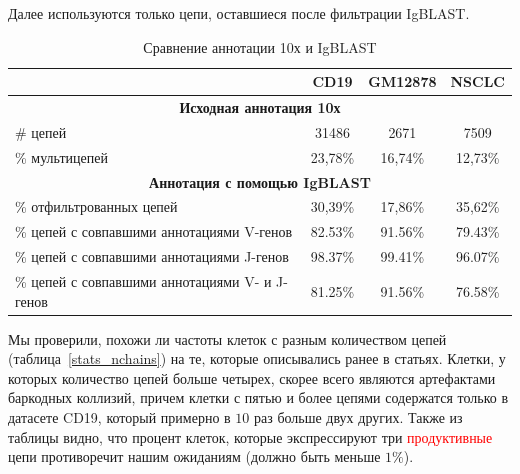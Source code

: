 \documentclass{spbau-diploma}
\newcommand{\todo}{\textcolor{red}}
\begin{document}
Далее используются только цепи, оставшиеся после фильтрации IgBLAST.  

\begin{table}[h]
\centering
\begin{tabular}{|l|c|c|c|}
\hline
                                               & \multicolumn{1}{c|}{\textbf{CD19}} & \multicolumn{1}{c|}{\textbf{GM12878}} & \multicolumn{1}{c|}{\textbf{NSCLC}} \\ \hline
\multicolumn{4}{|c|}{\textbf{Исходная аннотация 10х}}                                                                                                             \\ \hline
\# цепей                                       & 31486                              & 2671                                  & 7509                                \\ \hline
\% мультицепей                                 & 23,78\%                            & 16,74\%                               & 12,73\%                             \\ \hline
\multicolumn{4}{|c|}{\textbf{Аннотация с помощью IgBLAST}}                                                                                                       \\ \hline
\% отфильтрованных цепей                       & 30,39\%                            & 17,86\%                               & 35,62\%                             \\ \hline
\% цепей с совпавшими аннотациями V-генов      & 82.53\%                            & 91.56\%                               & 79.43\%                             \\ \hline
\% цепей с совпавшими аннотациями J-генов      & 98.37\%                            & 99.41\%                               & 96.07\%                             \\ \hline
\% цепей с совпавшими аннотациями V- и J-генов & 81.25\%                            & 91.56\%                               & 76.58\%                             \\ \hline
\end{tabular}
\caption{Сравнение аннотации 10х и IgBLAST}
\label{10x_vs_IgBLAST}
\end{table}

Мы проверили, похожи ли частоты клеток с разным количеством цепей (таблица~\ref{stats_nchains}) на те, которые описывались ранее в статьях.
Клетки, у которых количество цепей больше четырех, скорее всего являются артефактами баркодных коллизий, причем клетки с пятью и более цепями содержатся только в датасете CD19, который примерно в $10$ раз больше двух других.
Также из таблицы видно, что процент клеток, которые экспрессируют три \todo{продуктивные} цепи противоречит нашим ожиданиям (должно быть меньше $1\%$).
\end{document}
